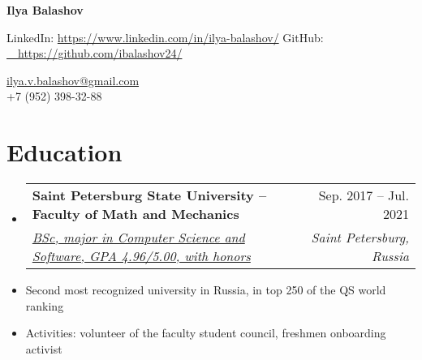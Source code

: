 \documentclass[letterpaper,10pt]{article}
\makeatletter
\newcommand{\resumeItem}[1]{
  \item\small{
    {#1 \vspace{-2pt}}
  }
}
\newcommand{\resumeSubheading}[4]{
  \vspace{-2pt}\item
    \begin{tabular*}{0.97\textwidth}[t]{l@{\extracolsep{\fill}}r}
      \textbf{#1} & #2 \\
      \textit{\small#3} & \textit{\small #4} \\
    \end{tabular*}\vspace{-7pt}
}
\newcommand{\resumeSubItem}[1]{\resumeItem{#1}\vspace{-4pt}}
\newcommand{\resumeSubHeadingListStart}{\begin{itemize}[leftmargin=0.15in, label={}]}
\newcommand{\resumeSubHeadingListEnd}{\end{itemize}}
\makeatother
\begin{document}
\begin{center}
    {\Huge \textbf{Ilya Balashov}} \\ \vspace{2pt}
    \begin{multicols}{2}
    \begin{flushleft}
    LinkedIn: \href{{https://www.linkedin.com/in/ibalashov24/}}{ https://www.linkedin.com/in/ilya-balashov/}
    GitHub: \href{{https://github.com/ibalashov24/}}{\ \  https://github.com/ibalashov24/} \\
    \end{flushleft}
    
    \begin{flushright}
    \href{mailto:{ilya.v.balashov@gmail.com}}{ilya.v.balashov@gmail.com}\\
    +7 (952) 398-32-88
    
    \end{flushright}
    \end{multicols}
\end{center}


\vspace{-2pt}
\section{Education}
  \resumeSubHeadingListStart
      \resumeSubheading
      {Saint Petersburg State University -- Faculty of Math and Mechanics}{Sep. 2017 -- Jul. 2021}
      {\href{https://diploma.spbu.ru/en?rn=0911006\&bd=19990809\&h=c41f9286a9064c78a1ef2309af6be0eb}{BSc, major in Computer Science and Software, GPA 4.96/5.00, with honors}}{Saint Petersburg, Russia}
      \resumeSubItem{Second most recognized university in Russia, in top 250 of the QS world ranking}{}
      \resumeSubItem{Activities: volunteer of the faculty student council, freshmen onboarding activist}{}
  \resumeSubHeadingListEnd


\end{document}
